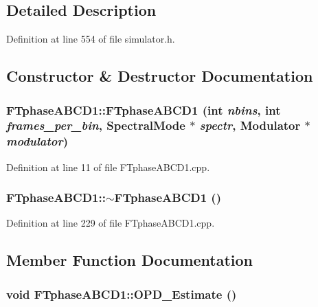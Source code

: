 \subsection{Detailed Description}


Definition at line 554 of file simulator.h.



\subsection{Constructor \& Destructor Documentation}
\hypertarget{classFTphaseABCD1_a69c82003f09a381dff29cc5efa4ed3ef}{
\subsubsection[{FTphaseABCD1}]{\setlength{\rightskip}{0pt plus 5cm}FTphaseABCD1::FTphaseABCD1 (int {\em nbins}, \/  int {\em frames\_\-per\_\-bin}, \/  {\bf SpectralMode} $\ast$ {\em spectr}, \/  {\bf Modulator} $\ast$ {\em modulator})}}
\label{classFTphaseABCD1_a69c82003f09a381dff29cc5efa4ed3ef}


Definition at line 11 of file FTphaseABCD1.cpp.

\hypertarget{classFTphaseABCD1_af1b4c85c00d3e00c8df0efaa40494754}{
\subsubsection[{$\sim$FTphaseABCD1}]{\setlength{\rightskip}{0pt plus 5cm}FTphaseABCD1::$\sim$FTphaseABCD1 ()}}
\label{classFTphaseABCD1_af1b4c85c00d3e00c8df0efaa40494754}


Definition at line 229 of file FTphaseABCD1.cpp.



\subsection{Member Function Documentation}
\hypertarget{classFTphaseABCD1_a2119089560c657b09d77000eecf620ee}{
\subsubsection[{OPD\_\-Estimate}]{\setlength{\rightskip}{0pt plus 5cm}void FTphaseABCD1::OPD\_\-Estimate ()}}
\label{classFTphaseABCD1_a2119089560c657b09d77000eecf620ee}


